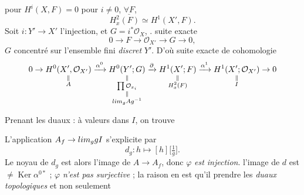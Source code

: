 \documentclass[11pt,a4paper]{article}
\begin{document}
 \struck{\ill{} \ill{}} pour $H^i(X, F) = 0$ pour 
$i \neq 0$, $\underline{\forall F}$,
\[
  H^2_x(F) \simeq H^1(X', F).
\]
Soit  $i : Y' \to X'$ l'injection, et $G =
i^{*}\mathcal{O}_X$, \ill{}.  suite exacte
\[
  0 \longrightarrow F \longrightarrow \mathcal{O}_{X'} \longrightarrow G
  \longrightarrow 0,
\]
$G$ concentré sur l'ensemble
fini \emph{discret} $Y'$. D'où  suite
exacte de cohomologie
\[
  0 \to \underset{\substack{\|\\ A}}{H^0(X', \mathcal{O}_{X'})}
  \xrightarrow{\alpha^0}
  \underset{\substack{\|\\ \prod \mathcal{O}_{x_i}\\ \|\\ \varinjlim_g A
  g^{-1}}}{H^0(Y'; G)}
  \xrightarrow{\partial}
  \underset{\substack{\|\\ H^2_x(F)}}{H^1(X'; F)}
  \xrightarrow{\alpha^1}
  \underset{\substack{\|\\ I}}{H^1(X'; \mathcal{O}_{X'})} \to 0
\]

Prenant les duaux : à valeurs dans $I$, on
trouve



L'application $A_f \to \varprojlim_g gI$ s'explicite par
\[
  d_g : h \longmapsto [h]\bigl[\tfrac{1}{g}\bigr].
\]
Le noyau de $d_g$ est alors l'image de $A \to A_f$, donc
$\varphi$ \emph{est injection}.  \ill{} \ill{} l'image de
$d$ est $\neq \operatorname{Ker} \alpha^{0*}$ ; $\varphi$ \emph{n'est pas
surjective} ; la raison en est qu'il  prendre les \emph{duaux
topologiques} et non seulement
\end{document}
